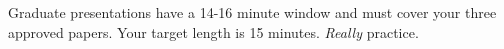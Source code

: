 \documentclass[10pt]{article}
\begin{document}
\begin{landscape}
Graduate presentations have a 14-16 minute window and must cover your three approved papers. Your target length is 15 minutes. \textit{Really} practice.

\end{landscape}
\end{document}
